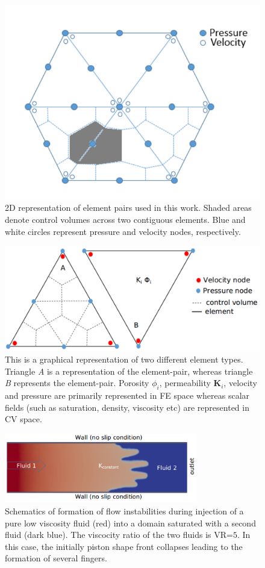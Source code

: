 
\begin{figure}[h]
\centering
\vbox{\includegraphics[width=.5\textwidth]{./Pics/P1DGP2.pdf}}
\caption{2D representation of  element pairs used in this work. Shaded areas denote control volumes across two contiguous elements. Blue and white circles represent pressure and velocity nodes, respectively.} 
\label{fig:fem_cv}
\end{figure}
\clearpage


\begin{figure}[h]
\centering
\vbox{\includegraphics[width=.75\textwidth]{./Pics/element_n.pdf}}
\caption{This is a graphical representation of two different element types. Triangle {\it A} is a representation of the  element-pair, whereas triangle {\it B} represents the  element-pair. Porosity $\phi_{i}$, permeability {\bf K}$_{i}$, velocity and pressure are primarily represented in FE space whereas scalar fields (such as saturation, density, viscosity etc) are represented in CV space.}
\label{fig:fem_elem}
\end{figure}
\clearpage

\begin{figure}[h]
\centering
\vbox{\includegraphics[width=0.75\textwidth]{./Pics/phase_vol_frac_uni_perm_1.pdf}}
\caption{Schematics of formation of flow instabilities during injection of a pure low viscosity fluid (red) into a domain saturated with a second fluid (dark blue). The viscocity ratio of the two fluids is VR=$5$. In this case, the initially piston shape front collapses leading to the formation of several fingers.}
\label{fig:simple_case}
\end{figure}
\clearpage


